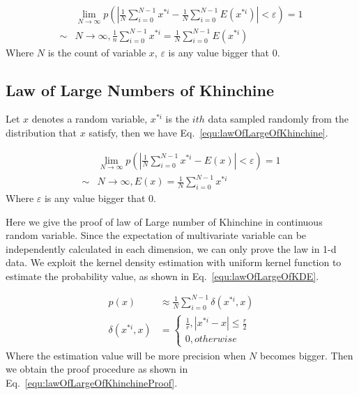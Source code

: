 \documentclass[runningheads,openany]{xhlPaper}
\begin{document}
\begin{equation}
\label{equ:lawOfLargeOfChebyshev}
\begin{aligned}
&\mathop {\lim }\limits_{N \to \infty } p\left( {|\frac{1}{N}\sum\limits_{i = 0}^{N - 1} {{x^{*i}}}  - \frac{1}{N}\sum\limits_{i = 0}^{N - 1} {E\left( {{x^{*i}}} \right)} | < \varepsilon } \right) = 1\\
 \sim &N \to \infty ,\frac{1}{n}\sum\limits_{i = 0}^{N - 1} {{x^{*i}}}  = \frac{1}{N}\sum\limits_{i = 0}^{N - 1} {E\left( {{x^{*i}}} \right)} 
\end{aligned}
\end{equation}
Where $N$ is the count of variable $x$, $\varepsilon$ is any value bigger that 0.

\subsection{Law of Large Numbers of Khinchine}
\label{sec:lawOfLargeKhinchine}
Let $x$ denotes a random variable, $x^{*i}$ is the $ith$ data sampled randomly from the distribution that $x$ satisfy, then we have Eq.~\ref{equ:lawOfLargeOfKhinchine}.

\begin{equation}
\label{equ:lawOfLargeOfKhinchine}
\begin{aligned}
&\mathop {\lim }\limits_{N \to \infty } p\left( {|\frac{1}{N}\sum\limits_{i = 0}^{N - 1} {{x^{*i}}}  - E\left( x \right)| < \varepsilon } \right) = 1\\
 \sim &N \to \infty ,E\left( x \right) = \frac{1}{N}\sum\limits_{i = 0}^{N - 1} {{x^{*i}}} 
\end{aligned}
\end{equation}
Where $\varepsilon$ is any value bigger that 0.

Here we give the proof of law of Large number of Khinchine in continuous random variable. Since the expectation of multivariate variable can be independently calculated in each dimension, we can only prove the law in 1-d data. We exploit the kernel density estimation with uniform kernel function to estimate the probability value, as shown in Eq.~\ref{equ:lawOfLargeOfKDE}.

\begin{equation}
\label{equ:lawOfLargeOfKDE}
\begin{aligned}
p\left( x \right) &\approx \frac{1}{N}\sum\limits_{i = 0}^{N - 1} {\delta \left( {{x^{*i}},x} \right)} \\
\delta \left( {{x^{*i}},x} \right) &= \left\{ {\begin{array}{*{20}{c}}
{\frac{1}{r},|{x^{*i}} - x| \le \frac{r}{2}}\\
{0,otherwise}
\end{array}} \right.
\end{aligned}
\end{equation}
Where the estimation value will be more precision when $N$ becomes bigger.
Then we obtain the proof procedure as shown in Eq.~\ref{equ:lawOfLargeOfKhinchineProof}.
\end{document}
